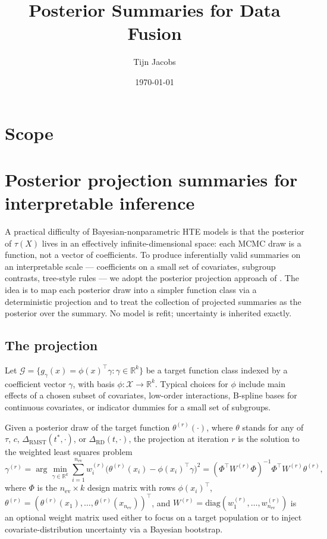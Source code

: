 \documentclass[11pt]{article}
\title{Posterior Summaries for Data Fusion}
\author{Tijn Jacobs}
\date{\today}
\theoremstyle{plain}
\theoremstyle{definition}
\theoremstyle{remark}
\newcommand{\1}{\mathds{1}}
\newcommand{\X}{X}
\newcommand{\tauf}{\tau}
\newcommand{\cf}{c}
\newcommand{\RMST}{\mathrm{RMST}}
\newcommand{\RD}{\mathrm{RD}}
\begin{document}
\maketitle

\section*{Scope}



\section{Posterior projection summaries for interpretable inference}

A practical difficulty of Bayesian-nonparametric HTE models is that the
posterior of $\tauf(\X)$ lives in an effectively infinite-dimensional space:
each MCMC draw is a function, not a vector of coefficients. To produce
inferentially valid summaries on an interpretable scale --- coefficients on
a small set of covariates, subgroup contrasts, tree-style rules --- we adopt
the posterior projection approach of \citet{Woody2020}. The idea is to map
each posterior draw into a simpler function class via a deterministic
projection and to treat the collection of projected summaries as the
posterior over the summary. No model is refit; uncertainty is inherited
exactly.

\subsection{The projection}

Let $\mathcal{G} = \{g_{\gamma}(x) = \phi(x)^{\top}\gamma : \gamma \in
\mathbb{R}^{k}\}$ be a target function class indexed by a coefficient vector
$\gamma$, with basis $\phi : \mathcal{X} \to \mathbb{R}^{k}$. Typical
choices for $\phi$ include main effects of a chosen subset of covariates,
low-order interactions, B-spline bases for continuous covariates, or
indicator dummies for a small set of subgroups.

Given a posterior draw of the target function $\theta^{(r)}(\cdot)$, where
$\theta$ stands for any of $\tauf$, $\cf$, $\Delta_{\RMST}(t^{*}, \cdot)$, or
$\Delta_{\RD}(t, \cdot)$, the projection at iteration $r$ is the solution to
the weighted least squares problem
\begin{equation}
  \gamma^{(r)} = \arg\min_{\gamma \in \mathbb{R}^{k}}
  \sum_{i=1}^{n_{\mathrm{ev}}}
  w_{i}^{(r)}\bigl(\theta^{(r)}(x_{i}) - \phi(x_{i})^{\top}\gamma\bigr)^{2}
  = (\Phi^{\top} W^{(r)} \Phi)^{-1}\Phi^{\top} W^{(r)} \theta^{(r)},
  \label{eq:projection}
\end{equation}
where $\Phi$ is the $n_{\mathrm{ev}} \times k$ design matrix with rows
$\phi(x_{i})^{\top}$, $\theta^{(r)} = (\theta^{(r)}(x_{1}), \ldots,
\theta^{(r)}(x_{n_{\mathrm{ev}}}))^{\top}$, and $W^{(r)} =
\mathrm{diag}(w_{1}^{(r)}, \ldots, w_{n_{\mathrm{ev}}}^{(r)})$ is an
optional weight matrix used either to focus on a target population or to
inject covariate-distribution uncertainty via a Bayesian bootstrap.
\end{document}
